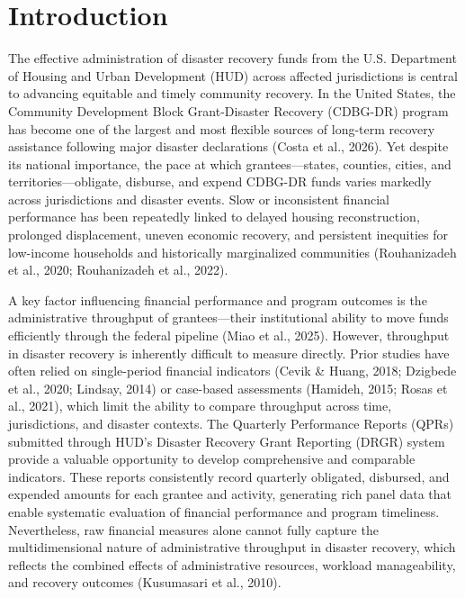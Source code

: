 \documentclass[
  number]{elsarticle}
\begin{document}
\section{Introduction}\label{introduction}

The effective administration of disaster recovery funds from the U.S.
Department of Housing and Urban Development (HUD) across affected
jurisdictions is central to advancing equitable and timely community
recovery. In the United States, the Community Development Block
Grant-Disaster Recovery (CDBG-DR) program has become one of the largest
and most flexible sources of long-term recovery assistance following
major disaster declarations (Costa et al., 2026). Yet despite its
national importance, the pace at which grantees---states, counties,
cities, and territories---obligate, disburse, and expend CDBG-DR funds
varies markedly across jurisdictions and disaster events. Slow or
inconsistent financial performance has been repeatedly linked to delayed
housing reconstruction, prolonged displacement, uneven economic
recovery, and persistent inequities for low-income households and
historically marginalized communities (Rouhanizadeh et al., 2020;
Rouhanizadeh et al., 2022).

A key factor influencing financial performance and program outcomes is
the administrative throughput of grantees---their institutional ability
to move funds efficiently through the federal pipeline (Miao et al.,
2025). However, throughput in disaster recovery is inherently difficult
to measure directly. Prior studies have often relied on single-period
financial indicators (Cevik \& Huang, 2018; Dzigbede et al., 2020;
Lindsay, 2014) or case-based assessments (Hamideh, 2015; Rosas et al.,
2021), which limit the ability to compare throughput across time,
jurisdictions, and disaster contexts. The Quarterly Performance Reports
(QPRs) submitted through HUD's Disaster Recovery Grant Reporting (DRGR)
system provide a valuable opportunity to develop comprehensive and
comparable indicators. These reports consistently record quarterly
obligated, disbursed, and expended amounts for each grantee and
activity, generating rich panel data that enable systematic evaluation
of financial performance and program timeliness. Nevertheless, raw
financial measures alone cannot fully capture the multidimensional
nature of administrative throughput in disaster recovery, which reflects
the combined effects of administrative resources, workload
manageability, and recovery outcomes (Kusumasari et al., 2010).
\end{document}

